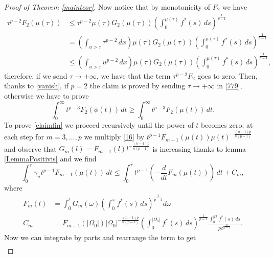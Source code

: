 \documentclass[12pt]{article}
\newcommand{\abs}[1]{{\left|#1\right|}}
\theoremstyle{definition}
\theoremstyle{plain}
\theoremstyle{definition}
\begin{document}
\begin{proof}[Proof of Theorem \ref{mainteor}]
    Now notice that by monotonicity of $F_2$ we have
    \begin{equation}\label{vanish}
        \begin{split}
            \tau^{p-2} F_2(\mu(\tau))&\leq\tau^{p-2}\mu(\tau)G_2(\mu(\tau))\left(\int_0^{\mu(\tau)}f^*(s)\,ds\right)^\frac{1}{p-1}\\
            &=\left(\int_{u>\tau}\tau^{p-2}\,dx\right)\mu(\tau)G_2(\mu(\tau))\left(\int_0^{\mu(\tau)}f^*(s)\,ds\right)^\frac{1}{p-1}\\
            &\leq\left(\int_{u>\tau}u^{p-2}\,dx\right)\mu(\tau)G_2(\mu(\tau))\left(\int_0^{\mu(\tau)}f^*(s)\,ds\right)^\frac{1}{p-1},
        \end{split}
    \end{equation}     
    therefore, if we send $\tau\to+\infty$, we have that the term $\tau^{p-2}F_2$ goes to zero. Then, thanks to \eqref{vanish}, if $p=2$ the claim is proved by sending $\tau\rightarrow+\infty$ in \eqref{779}, otherwise we have to prove
    \begin{equation}\label{claimfin}
        \int_0^\infty t^{p-3}F_2(\phi(t))\,dt\geq\int_0^\infty t^{p-3}F_2(\mu(t))\,dt.
    \end{equation}
    To prove \eqref{claimfin} we proceed recursively until the power of $t$ becomes zero; at each step for $m=3,\dots,p$ we multiply \eqref{16} by $t^{p-1}F_{m-1}(\mu(t))\mu(t)^{-\frac{(n-1)p}{n(p-1)}}$ and observe that $G_m(l)=F_{m-1}(l)l^{-\frac{(n-1)p}{n(p-1)}}$ is increasing thanks to lemma \ref{LemmaPositivis} and we find
    \begin{equation*}
        \int_0^\tau\gamma_n t^{p-1}F_{m-1}(\mu(t))\,dt\leq\int_0^\tau t^{p-1}\left(-\frac{d}{dt}F_m(\mu(t))\right)\,dt+C_m,
    \end{equation*}
    where
    \begin{equation*}
        \begin{split}
            F_m(l)&=\int_0^lG_m(\omega)\left(\int_0^\omega f^*(s)\,ds\right)^\frac{1}{p-1}d\omega\\
            C_m&=F_{m-1}(\abs{\Omega_0})\abs{\Omega_0}^{-\frac{(n-1)p}{n(p-1)}}\left(\int_0^{\abs{\Omega_0}}f^*(s)\,ds\right)^\frac{1}{p-1}\frac{\int_0^{\abs{\Omega}} f^*(s)\,ds}{p\beta^\frac{p}{p-1}}.
        \end{split}
    \end{equation*}
    Now we can integrate by parts and rearrange the term to get
    \begin{equation}
        \begin{split}

\end{split}
\end{equation}
\end{proof}
\end{document}

